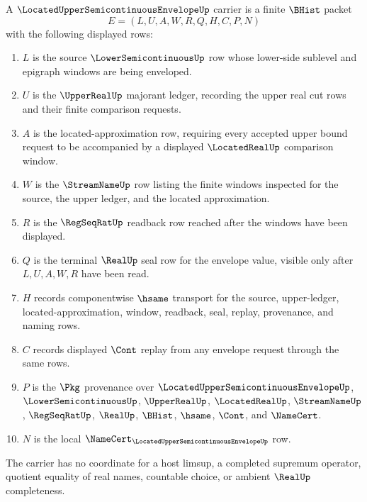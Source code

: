 \begin{definition}
\label{def:located-upper-semicontinuous-envelope-carrier}
A $\LocatedUpperSemicontinuousEnvelopeUp$ carrier is a finite $\BHist$ packet
$$
E=(L,U,A,W,R,Q,H,C,P,N)
$$
with the following displayed rows:
\begin{enumerate}
\item $L$ is the source $\LowerSemicontinuousUp$ row whose lower-side
sublevel and epigraph windows are being enveloped.
\item $U$ is the $\UpperRealUp$ majorant ledger, recording the upper real
cut rows and their finite comparison requests.
\item $A$ is the located-approximation row, requiring every accepted upper
bound request to be accompanied by a displayed $\LocatedRealUp$ comparison
window.
\item $W$ is the $\StreamNameUp$ row listing the finite windows inspected for
the source, the upper ledger, and the located approximation.
\item $R$ is the $\RegSeqRatUp$ readback row reached after the windows have
been displayed.
\item $Q$ is the terminal $\RealUp$ seal row for the envelope value, visible
only after $L,U,A,W,R$ have been read.
\item $H$ records componentwise $\hsame$ transport for the source,
upper-ledger, located-approximation, window, readback, seal, replay,
provenance, and naming rows.
\item $C$ records displayed $\Cont$ replay from any envelope request through
the same rows.
\item $P$ is the $\Pkg$ provenance over
$\LocatedUpperSemicontinuousEnvelopeUp$, $\LowerSemicontinuousUp$,
$\UpperRealUp$, $\LocatedRealUp$, $\StreamNameUp$, $\RegSeqRatUp$,
$\RealUp$, $\BHist$, $\hsame$, $\Cont$, and $\NameCert$.
\item $N$ is the local $\NameCert_{\LocatedUpperSemicontinuousEnvelopeUp}$
row.
\end{enumerate}
The carrier has no coordinate for a host limsup, a completed supremum
operator, quotient equality of real names, countable choice, or ambient
$\RealUp$ completeness.
\end{definition}

